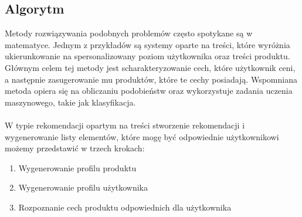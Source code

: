 \documentclass[12pt,a4paper]{report}
\begin{document}
\subsection{Algorytm}
Metody rozwiązywania podobnych problemów często spotykane są w matematyce. Jednym z przykładów są systemy oparte na treści, które wyróżnia ukierunkowanie na spersonalizowany poziom użytkownika oraz treści produktu. Głównym celem tej metody jest scharakteryzowanie cech, które użytkownik ceni, a następnie zasugerowanie mu produktów, które te cechy posiadają. Wspomniana metoda opiera się na obliczaniu podobieństw oraz wykorzystuje zadania uczenia maszynowego, takie jak klasyfikacja.
\\
\\
W typie rekomendacji opartym na treści stworzenie rekomendacji i wygenerowanie listy elementów, które mogę być odpowiednie użytkownikowi możemy przedstawić w trzech krokach:
\begin{enumerate}
\item{Wygenerowanie profilu produktu}
\item{Wygenerowanie profilu użytkownika}
\item{Rozpoznanie cech produktu odpowiednich dla użytkownika}
\end{enumerate}
\end{document}
